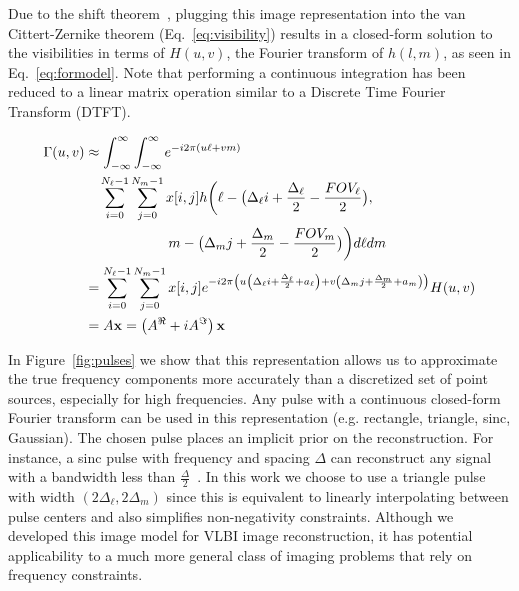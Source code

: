 {%
 
 Due to the shift theorem~\cite{oppenheim1997signals}, plugging this image representation into the van Cittert-Zernike theorem (Eq.~\ref{eq:visibility}) results in a closed-form solution to the visibilities in terms of $H(u,v)$, the Fourier transform of $h(l,m)$, as seen in Eq.~\ref{eq:formodel}. Note that performing a continuous integration has been reduced to a linear matrix operation similar to a Discrete Time Fourier Transform (DTFT). 

\begin{align}
		 \Gamma(u,v) &\approx \int_{- \infty}^{\infty}\int_{- \infty}^{\infty} {e^{-i 2 \pi  (u\ell + vm) }} 
		 \nonumber \\ & \quad \sum_{i=0}^{N_\ell-1}\sum_{j=0}^{N_m-1} x[i,j] 
		h \biggl(\ell- \bigl( \Delta_{\ell}i + \frac{\Delta_{\ell}}{2}  -\frac{FOV_\ell}{2} \bigr), \nonumber\\ 
		&  \qquad \qquad \qquad m- \bigl( \Delta_mj + \frac{\Delta_m}{2} -\frac{FOV_m}{2} \bigr) \biggl)  d\ell dm  
		\nonumber\\ &=  \sum_{i=0}^{N_\ell-1}{\sum_{j=0}^{N_m-1}  x[i,j] e^{-i 2 \pi \left(u  \left( \Delta_{\ell}i + \frac{\Delta_{\ell}}{2} + a_\ell \right) + v \left( \Delta_mj + \frac{\Delta_m}{2} + a_m \right)  \right)} H(u, v)} \nonumber\\ & = A {\bf x} = \left( A^{\Re} + i A^{\Im} \right) {\bf x}
		\label{eq:formodel}
		\end{align}

 
In Figure~\ref{fig:pulses} we show that this representation allows us to approximate the true frequency components more accurately than a discretized set of point sources, especially for high frequencies.  
Any pulse with a continuous closed-form Fourier transform can be used in this representation (e.g. rectangle, triangle, sinc, Gaussian). The chosen pulse places an implicit prior on the reconstruction. For instance, a sinc pulse with frequency and spacing $\Delta$ can reconstruct any signal with a bandwidth less than $\frac{\Delta}{2}$~\cite{oppenheim1997signals}. In this work we choose to use a triangle pulse with width $(2\Delta_\ell, 2\Delta_m)$ since this is equivalent to linearly interpolating between pulse centers and also simplifies 
non-negativity constraints. %
Although we developed this image model for VLBI image reconstruction, it has potential applicability to a much more general class of imaging problems that rely on frequency constraints.

}
